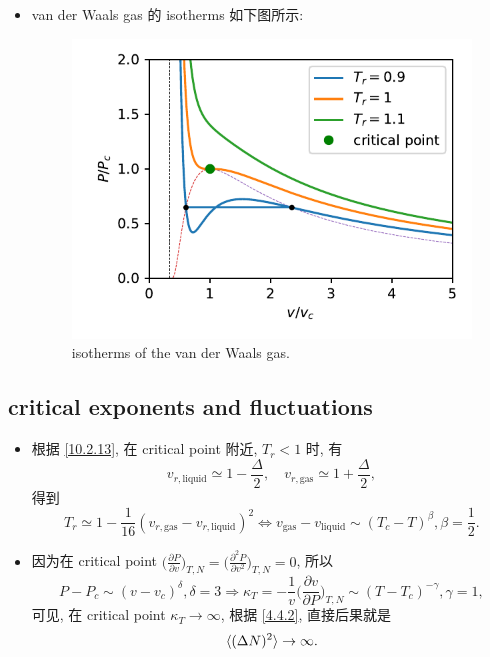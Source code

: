 \begin{itemize}
	\item van der Waals gas 的 isotherms 如下图所示:
	
	\begin{figure}[H]
		\centering
		\includegraphics[scale=0.8]{figures/isotherms of the van der Waals gas.pdf}
		\caption{isotherms of the van der Waals gas.}
	\end{figure}
\end{itemize}

\subsection{critical exponents and fluctuations}
\begin{itemize}
	\item 根据 \eqref{10.2.13}, 在 critical point 附近, $T_r < 1$ 时, 有
	\begin{equation}
		v_{r, \text{liquid}} \simeq 1 - \frac{\Delta}{2}, \quad v_{r, \text{gas}} \simeq 1 + \frac{\Delta}{2},
	\end{equation}
	得到
	\begin{equation}
		T_r \simeq 1 - \frac{1}{16} (v_{r, \text{gas}} - v_{r, \text{liquid}})^2 \iff v_\text{gas} - v_\text{liquid} \sim (T_c - T)^\beta, \beta = \frac{1}{2}.
	\end{equation}
	
	\item 因为在 critical point $\big( \frac{\partial P}{\partial v} \big)_{T, N} = \big( \frac{\partial^2 P}{\partial v^2} \big)_{T, N} = 0$, 所以
	\begin{equation}
		P - P_c \sim (v - v_c)^\delta, \delta = 3 \Longrightarrow \kappa_T = - \frac{1}{v} \Big( \frac{\partial v}{\partial P} \Big)_{T, N} \sim (T - T_c)^{- \gamma}, \gamma = 1,
	\end{equation}
	可见, 在 critical point $\kappa_T \rightarrow \infty$, 根据 \eqref{4.4.2}, 直接后果就是
	\begin{equation}
		\braket{(\Delta N)^2} \rightarrow \infty.
	\end{equation}
\end{itemize}

